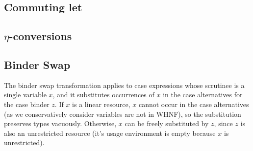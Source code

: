\documentclass[acmsmall,review,anonymous]{acmart}
\begin{document}


\subsection{Commuting let}



\subsection{\texorpdfstring{$\eta$}{Eta}-conversions}



\subsection{Binder Swap}

The binder swap transformation applies to case expressions whose scrutinee is a
single variable $x$, and it substitutes occurrences of $x$ in the case
alternatives for the case binder $z$. If $x$ is a linear resource, $x$ cannot
occur in the case alternatives (as we conservatively consider variables are not
in WHNF), so the substitution preserves types vacuously. Otherwise, $x$ can be
freely substituted by $z$, since $z$ is also an unrestricted resource (it's
usage environment is empty because $x$ is unrestricted).





\end{document}
